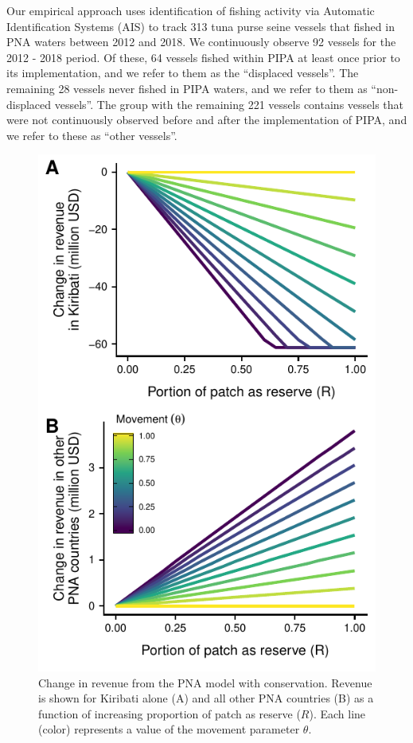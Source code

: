 \documentclass[9p,twocolumn,twoside,lineno]{pnas-new}
\begin{document}
Our empirical approach uses identification of fishing activity via Automatic Identification Systems (AIS) to track 313 tuna purse seine vessels that fished in PNA waters between 2012 and 2018. We continuously observe 92 vessels for the 2012 - 2018 period. Of these, 64 vessels fished within PIPA at least once prior to its implementation, and we refer to them as the ``displaced vessels''. The remaining 28 vessels never fished in PIPA waters, and we refer to them as ``non-displaced vessels''. The group with the remaining 221 vessels contains vessels that were not continuously observed before and after the implementation of PIPA, and we refer to these as ``other vessels''.

\begin{figure}[htbp]
\centering
\includegraphics{img/PNA_model.pdf}
\caption{\label{fig:PNA_model}Change in revenue from the PNA model with conservation. Revenue is shown for Kiribati alone (A) and all other PNA countries (B) as a function of increasing proportion of patch as reserve ($R$). Each line (color) represents a value of the movement parameter $\theta$.}
\end{figure}
\end{document}
